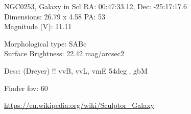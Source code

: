 \begin{block}{NGC0253, Galaxy in Scl}
    RA: 00:47:33.12, Dec: -25:17:17.6 \\ 
    Dimensions: 26.79 x 4.58 PA: 53 \\ 
    Magnitude (V): 11.11

    Morphological type: SABc \\ 
    Surface Brightness: 22.42 mag/arcsec2 

    Desc: (Dreyer) !! vvB, vvL, vmE 54deg , gbM 

    Finder fov: 60 

    \url{https://en.wikipedia.org/wiki/Sculptor_Galaxy} 
\end{block}